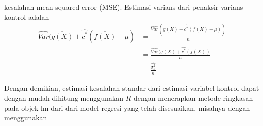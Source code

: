 \documentclass[a4paper,12pt]{article}
\theoremstyle{definition}
\begin{document}
kesalahan mean squared error (MSE). Estimasi varians dari penaksir varians kontrol adalah
\begin{equation*}
    \begin{split}
        \widehat{Var}(\overline{g(X)}+\widehat{c^{*}}(\overline{f(X)}-\mu)&=\frac{\widehat{Var}(g(X)+\widehat{c^{*}}(f(X)-\mu))}{n}\\
        &=\frac{\widehat{Var}(g(X)+\widehat{c^{*}}(f(X))}{n}\\
        &=\frac{\widehat{\sigma ^{2}_{\varepsilon }}}{n}
    \end{split}
\end{equation*}

Dengan demikian, estimasi kesalahan standar dari estimasi variabel kontrol dapat dengan mudah dihitung menggunakan $R$ dengan menerapkan metode ringkasan pada objek lm dari dari model regresi yang telah disesuaikan, misalnya dengan menggunakan
\end{document}
